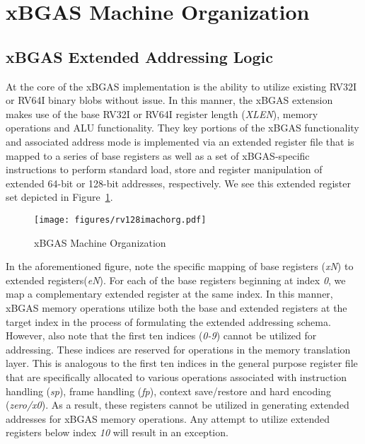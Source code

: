 \documentclass{article}
\begin{document}
\clearpage
\section{xBGAS Machine Organization}

\subsection{xBGAS Extended Addressing Logic}

At the core of the xBGAS implementation is the ability to utilize existing RV32I or RV64I 
binary blobs without issue.  In this manner, the xBGAS extension makes use 
of the base RV32I or RV64I register length (\textit{XLEN}), memory operations and ALU functionality.  
They key portions of the xBGAS functionality and associated address mode 
is implemented via an extended register file that is mapped to a series 
of base registers as well as a set of xBGAS-specific instructions to perform 
standard load, store and register manipulation of extended 64-bit or 128-bit addresses, respectively.  We 
see this extended register set depicted in Figure~\ref{fig:machineorganization}.  

\begin{figure}[h!]
\begin{center}
\texttt{[image: figures/rv128imachorg.pdf]}
\caption{xBGAS Machine Organization}
\label{fig:machineorganization}
\end{center}
\end{figure}

In the aforementioned figure, note the specific mapping of base registers 
(\textit{xN}) to extended registers(\textit{eN}).  For each of the base 
registers beginning at index \textit{0}, we map a complementary extended 
register at the same index.  In this manner, xBGAS memory operations 
utilize both the base and extended registers at the target index in the process 
of formulating the extended addressing schema.  However, also note that 
the first ten indices (\textit{0-9}) cannot be utilized for addressing.  These 
indices are reserved for operations in the memory translation layer.  This is 
analogous to the first ten indices in the general purpose register file 
that are specifically allocated to various operations associated with instruction 
handling (\textit{sp}), frame handling (\textit{fp}), context save/restore 
and hard encoding (\textit{zero/x0}).  As a result, these registers cannot be 
utilized in generating extended addresses for xBGAS memory operations.  
Any attempt to utilize extended registers below index \textit{10} will 
result in an exception.    
\end{document}
